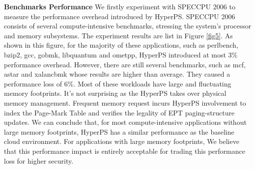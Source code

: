 \textbf{Benchmarks Performance}
We firstly experiment with SPECCPU 2006 to measure the performance overhead introduced by HyperPS.
SPECCPU 2006 consists of several compute-intensive benchmarks, stressing the system's processor and memory subsystems. 
The experiment results are list in Figure \ref{fig5}. As shown in this figure, for the majority of these applications, such as perlbench, bzip2, gcc, gobmk, libquantum and ometpp, 
HyperPS introduced at most 3\% performance overhead. 
However, there are still several benchmarks, such as mcf, astar and xalancbmk whose results are higher than average. 
They caused a performance loss of 6\%. 
Most of these workloads have large and fluctuating memory footprints. 
It's not surprising as the HyperPS takes over physical memory management. Frequent memory request incurs HyperPS involvement to index the Page-Mark Table and verifies the legality of EPT paging-structure updates.
We can conclude that, for most compute-intensive applications without large memory footprints, HyperPS has a similar performance as the baseline cloud environment. 
For applications with large memory footprints, 
We believe that this performance impact is entirely acceptable for trading this performance loss for higher security.




